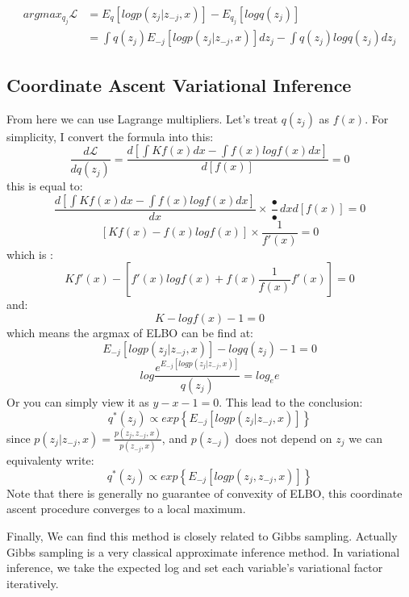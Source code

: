 \documentclass{article}
\begin{document}
\begin{align*}
argmax_{q_{j}} \mathcal{L} &=E_{q}[logp(z_{j}|z_{-j},x)]-E_{q_{j}}[logq(z_{j})] \\
&= \int q(z_{j})E_{-j}[logp(z_{j}|z_{-j},x)]dz_{j}-\int q(z_{j})logq(z_{j})dz_{j}
\end{align*}

\subsection{Coordinate Ascent Variational Inference}
From here we can use Lagrange multipliers. Let's treat $q(z_{j})$ as $f(x)$.
For simplicity, I convert the formula into this:
$$\frac{d \mathcal{L}}{dq(z_{j})}=\frac{d[\int Kf(x)dx- \int f(x)logf(x)dx]}{d[f(x)]}=0$$
this is equal to:
$$\frac{d[\int Kf(x)dx- \int f(x)logf(x)dx]}{dx} \times \frac{•}{•}{dx}{d[f(x)]}=0$$
$$ [ K f(x)-f(x)logf(x)] \times \frac{1}{f'(x)}=0$$
which is :
$$Kf'(x)-[f'(x)logf(x)+f(x) \frac{1}{f(x)}f'(x)]  =0$$
and:
$$K-logf(x)-1=0$$
which means the argmax of ELBO can be find at: 
$$E_{-j}[logp(z_{j}|z_{-j},x)]-logq(z_{j})-1=0$$
$$log \frac{ e^{E_{-j}[logp(z_{j}|z_{-j},x)]}}{q(z_{j})}= log_{e}e $$
Or you can simply view it as $y-x-1=0$.
This lead to the conclusion:
$$q^{*}(z_{j}) \propto exp \left\{ E_{-j}[logp(z_{j}|z_{-j},x)] \right\}$$
since $p(z_{j}|z_{-j},x)=\frac{p(z_{j},z_{-j},x)}{p(z_{-j},x)} $, and $p(z_{-j})$ does not depend on $z_{j}$ we can equivalenty write:
$$q^{*}(z_{j}) \propto exp \left\{ E_{-j}[logp(z_{j},z_{-j},x)] \right\}$$
Note that there is generally no guarantee of convexity of ELBO, this coordinate ascent procedure converges to a local maximum.

Finally, We can find this method is closely related to Gibbs sampling. Actually Gibbs sampling is a very classical approximate inference method. In variational inference,
we take the expected log and set each variable’s variational factor iteratively.
\end{document}
